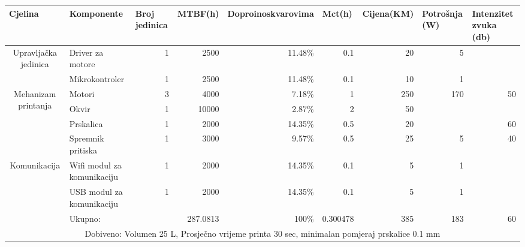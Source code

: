 \documentclass[12pt]{article}
\begin{document}
\begin{landscape}
\begin{table}[htbp]
\begin{tabular}{ccccccccc}
    \toprule
    \multicolumn{1}{l}{Cjelina} & \multicolumn{1}{l}{Komponente} & \multicolumn{1}{l}{Broj jedinica} & \multicolumn{1}{l}{MTBF(h)} & \multicolumn{1}{p{5.215em}}{Doproinos\newline{}kvarovima} & \multicolumn{1}{l}{Mct(h)} & \multicolumn{1}{l}{Cijena(KM)} & \multicolumn{1}{l}{Potrošnja (W)} & \multicolumn{1}{l}{Intenzitet zvuka (db)} \\
    \midrule
    \multirow{2}[4]{*}{Upravljačka jedinica} & \multicolumn{1}{l}{Driver za motore} & \multicolumn{1}{r}{1} & \multicolumn{1}{r}{2500} & \multicolumn{1}{r}{11.48\%} & \multicolumn{1}{r}{0.1} & \multicolumn{1}{r}{20} & \multicolumn{1}{r}{5} &  \\
\cmidrule{5-5}          & \multicolumn{1}{l}{Mikrokontroler} & \multicolumn{1}{r}{1} & \multicolumn{1}{r}{2500} & \multicolumn{1}{r}{11.48\%} & \multicolumn{1}{r}{0.1} & \multicolumn{1}{r}{10} & \multicolumn{1}{r}{1} &  \\
    \midrule
    \multirow{4}[8]{*}{Mehanizam printanja} & \multicolumn{1}{l}{Motori} & \multicolumn{1}{r}{3} & \multicolumn{1}{r}{4000} & \multicolumn{1}{r}{7.18\%} & \multicolumn{1}{r}{1} & \multicolumn{1}{r}{250} & \multicolumn{1}{r}{170} & \multicolumn{1}{r}{50} \\
\cmidrule{5-5}          & \multicolumn{1}{l}{Okvir} & \multicolumn{1}{r}{1} & \multicolumn{1}{r}{10000} & \multicolumn{1}{r}{2.87\%} & \multicolumn{1}{r}{2} & \multicolumn{1}{r}{50} &       &  \\
\cmidrule{5-5}          & \multicolumn{1}{l}{Prskalica} & \multicolumn{1}{r}{1} & \multicolumn{1}{r}{2000} & \multicolumn{1}{r}{14.35\%} & \multicolumn{1}{r}{0.5} & \multicolumn{1}{r}{20} &       & \multicolumn{1}{r}{60} \\
\cmidrule{5-5}          & \multicolumn{1}{l}{Spremnik pritiska} & \multicolumn{1}{r}{1} & \multicolumn{1}{r}{3000} & \multicolumn{1}{r}{9.57\%} & \multicolumn{1}{r}{0.5} & \multicolumn{1}{r}{25} & \multicolumn{1}{r}{5} & \multicolumn{1}{r}{40} \\
    \midrule
    \multirow{2}[4]{*}{Komunikacija} & \multicolumn{1}{l}{Wifi modul za komunikaciju} & \multicolumn{1}{r}{1} & \multicolumn{1}{r}{2000} & \multicolumn{1}{r}{14.35\%} & \multicolumn{1}{r}{0.1} & \multicolumn{1}{r}{5} & \multicolumn{1}{r}{1} &  \\
\cmidrule{5-5}          & \multicolumn{1}{l}{USB modul za komunikaciju} & \multicolumn{1}{r}{1} & \multicolumn{1}{r}{2000} & \multicolumn{1}{r}{14.35\%} & \multicolumn{1}{r}{0.1} & \multicolumn{1}{r}{5} & \multicolumn{1}{r}{1} &  \\
    \midrule
          & \multicolumn{1}{l}{Ukupno:} &       & \multicolumn{1}{r}{287.0813} & \multicolumn{1}{r}{100\%} & \multicolumn{1}{r}{0.300478} & \multicolumn{1}{r}{385} & \multicolumn{1}{r}{183} & \multicolumn{1}{r}{60} \\
    \midrule
    \multicolumn{9}{c}{Dobiveno: Volumen 25 L, Prosječno vrijeme printa 30 sec, minimalan pomjeraj prskalice 0.1 mm} \\
    \bottomrule
    \end{tabular}%
  \label{tab:rjesenje2}%
\end{table}%


\end{landscape}
\end{document}
